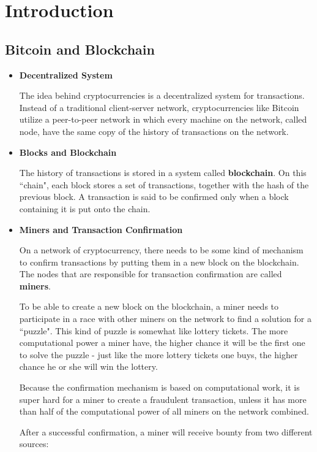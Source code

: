 \section{Introduction}
  \subsection{Bitcoin and Blockchain}
  \begin{itemize}
    \item \textbf{Decentralized System}
      \par The idea behind cryptocurrencies is a decentralized system for transactions. Instead of a traditional client-server network, cryptocurrencies like Bitcoin utilize a peer-to-peer network in which every machine on the network, called node, have the same copy of the history of transactions on the network.
    \item \textbf{Blocks and Blockchain}
      \par The history of transactions is stored in a system called \textbf{blockchain}. On this ``chain", each block stores a set of transactions, together with the hash of the previous block. A transaction is said to be confirmed only when a block containing it is put onto the chain.
    \item \textbf{Miners and Transaction Confirmation}
      \par On a network of cryptocurrency, there needs to be some kind of mechanism to confirm transactions by putting them in a new block on the blockchain. The nodes that are responsible for transaction confirmation are called \textbf{miners}.
      \par To be able to create a new block on the blockchain, a miner needs to participate in a race with other miners on the network to find a solution for a ``puzzle". This kind of puzzle is somewhat like lottery tickets. The more computational power a miner have, the higher chance it will be the first one to solve the puzzle - just like the more lottery tickets one buys, the higher chance he or she will win the lottery.
      \par Because the confirmation mechanism is based on computational work, it is super hard for a miner to create a fraudulent transaction, unless it has more than half of the computational power of all miners on the network combined.
      \par After a successful confirmation, a miner will receive bounty from two different sources:
      \begin{itemize}

\end{itemize}
\end{itemize}

